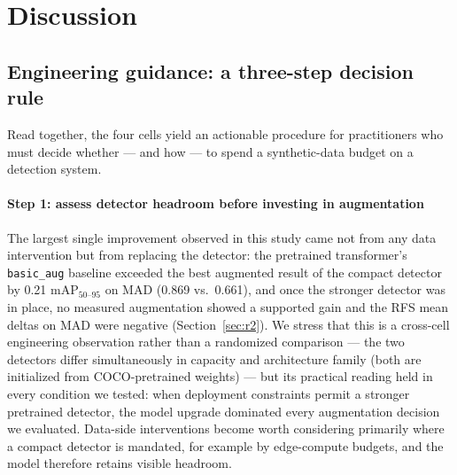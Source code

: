 \documentclass[preprint,12pt,authoryear]{elsarticle}
\newcommand{\mapm}{mAP\(_{50\text{--}95}\)}
\begin{document}
\section{Discussion}\label{sec:discussion}

\subsection{Engineering guidance: a three-step decision rule}\label{sec:rules}

Read together, the four cells yield an actionable procedure for
practitioners who must decide whether --- and how --- to spend a
synthetic-data budget on a detection system.

\paragraph{Step 1: assess detector headroom before investing in
augmentation}
The largest single improvement observed in this study came not from any
data intervention but from replacing the detector: the pretrained
transformer's \texttt{basic\_aug} baseline exceeded the best augmented
result of the compact detector by 0.21 \mapm{} on MAD (0.869 vs.\
0.661), and once the stronger detector was in place, no measured
augmentation showed a supported gain and the RFS mean deltas on MAD
were negative (Section~\ref{sec:r2}). We stress that this is a cross-cell engineering
observation rather than a randomized comparison --- the two detectors
differ simultaneously in capacity and architecture family (both are
initialized from COCO-pretrained weights) --- but its practical reading
held in every condition we tested: when deployment constraints permit a
stronger pretrained detector, the model upgrade dominated every
augmentation decision we evaluated. Data-side interventions become
worth considering primarily where a compact detector is mandated, for
example by edge-compute budgets, and the model therefore retains
visible headroom.
\end{document}
